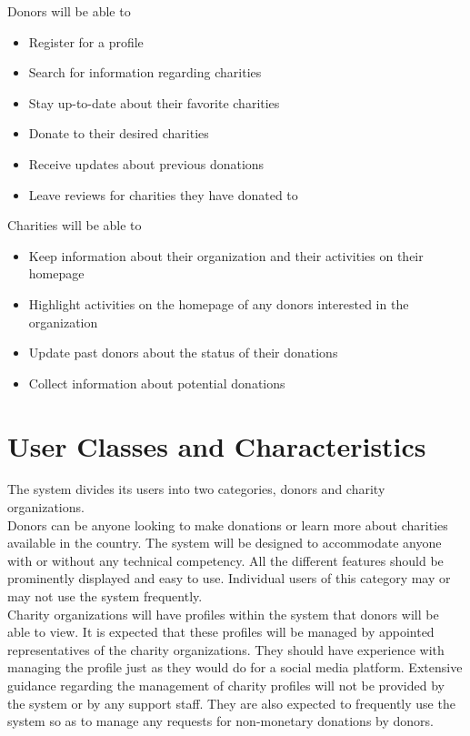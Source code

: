\documentclass{scrreprt}
\begin{document}
Donors will be able to
\begin{itemize}
  \item Register for a profile
  \item Search for information regarding charities
  \item Stay up-to-date about their favorite charities
  \item Donate to their desired charities
  \item Receive updates about previous donations
  \item Leave reviews for charities they have donated to\\
\end{itemize}
\clearpage
Charities will be able to
\begin{itemize}
  \item Keep information about their organization and their activities on their homepage
  \item Highlight activities on the homepage of any donors interested in the organization
  \item Update past donors about the status of their donations
  \item Collect information about potential donations\\
\end{itemize}

\section{User Classes and Characteristics}

The system divides its users into two categories, donors and charity organizations.\\

Donors can be anyone looking to make donations or learn more about charities available in the country. The system will be designed to accommodate anyone with or without any technical competency. All the different features should be prominently displayed and easy to use. Individual users of this category may or may not use the system frequently.\\

Charity organizations will have profiles within the system that donors will be able to view. It is expected that these profiles will be managed by appointed representatives of the charity organizations. They should have experience with managing the profile just as they would do for a social media platform. Extensive guidance regarding the management of charity profiles will not be provided by the system or by any support staff. They are also expected to frequently use the system so as to manage any requests for non-monetary donations by donors.\\
\end{document}
